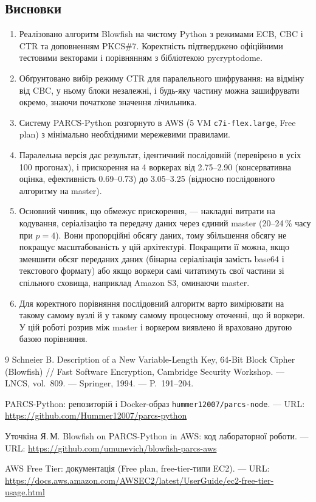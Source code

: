 \documentclass[a4paper,12pt]{article}
\begin{document}
\subsection{Висновки}
\begin{enumerate}
  \item Реалізовано алгоритм Blowfish на чистому Python з режимами ECB, CBC і CTR та
        доповненням PKCS\#7. Коректність підтверджено офіційними тестовими векторами
        і порівнянням з бібліотекою pycryptodome.
  \item Обґрунтовано вибір режиму CTR для паралельного шифрування: на відміну від CBC,
        у ньому блоки незалежні, і будь-яку частину можна зашифрувати окремо, знаючи
        початкове значення лічильника.
  \item Систему PARCS-Python розгорнуто в AWS (5 VM \texttt{c7i-flex.large}, Free plan)
        з мінімально необхідними мережевими правилами.
  \item Паралельна версія дає результат, ідентичний послідовній (перевірено в усіх 100 прогонах),
        і прискорення на 4 воркерах від 2.75--2.90 (консервативна оцінка, ефективність
        0.69--0.73) до 3.05--3.25 (відносно послідовного алгоритму на master).
  \item Основний чинник, що обмежує прискорення, --- накладні витрати на кодування,
        серіалізацію та передачу даних через єдиний master (20--24\,\% часу при $p=4$).
        Вони пропорційні обсягу даних, тому збільшення обсягу не покращує
        масштабованість у цій архітектурі. Покращити її можна, якщо зменшити обсяг
        переданих даних (бінарна серіалізація замість base64 і текстового формату)
        або якщо воркери самі читатимуть свої частини зі спільного сховища,
        наприклад Amazon S3, оминаючи master.
  \item Для коректного порівняння послідовний алгоритм варто вимірювати на такому самому
        вузлі й у такому самому процесному оточенні, що й воркери. У цій роботі розрив
        між master і воркером виявлено й враховано другою базою порівняння.
\end{enumerate}

\begin{thebibliography}{9}
  Schneier B. Description of a New Variable-Length Key, 64-Bit Block Cipher (Blowfish) //
  Fast Software Encryption, Cambridge Security Workshop. --- LNCS, vol.~809. --- Springer, 1994. --- P.~191--204.

  PARCS-Python: репозиторій і Docker-образ \texttt{hummer12007/parcs-node}. ---
  URL: \url{https://github.com/Hummer12007/parcs-python}

  Уточкіна Я.\,М. Blowfish on PARCS-Python in AWS: код лабораторної роботи. ---
  URL: \url{https://github.com/umunevich/blowfish-parcs-aws}

  AWS Free Tier: документація (Free plan, free-tier-типи EC2). ---
  URL: \url{https://docs.aws.amazon.com/AWSEC2/latest/UserGuide/ec2-free-tier-usage.html}

\end{thebibliography}
\end{document}
